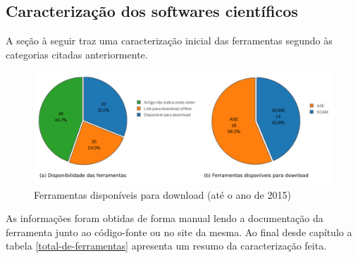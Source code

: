 \subsection{Caracterização dos softwares científicos}

A seção à seguir traz uma caracterização inicial das ferramentas segundo às
categorias citadas anteriormente.

\begin{figure}[h]
  \center
  \includegraphics[scale=0.85]{imagens/ferramentas-disponiveis.png}
  \caption{Ferramentas disponíveis para download (até o ano de 2015)}
  \label{ferramentas-disponiveis}
\end{figure}

As informações foram obtidas de forma manual lendo a documentação da ferramenta
junto ao código-fonte ou no site da mesma.  Ao final desde capítulo a tabela
\ref{total-de-ferramentas} apresenta um resumo da caracterização feita.


